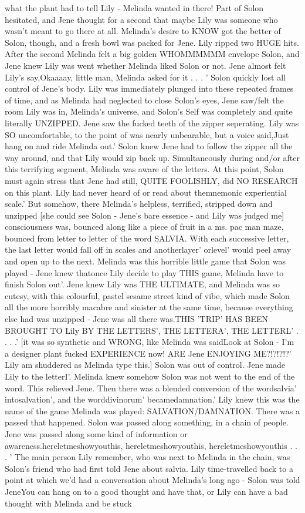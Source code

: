 \documentclass[12pt]{book}
\begin{document}
what the plant had to tell Lily - Melinda wanted in there! Part of Solon hesitated, and Jene thought for a second that maybe Lily was someone who wasn't meant to go there at all. Melinda's desire to KNOW got the better of Solon, though, and a fresh bowl was packed for Jene. Lily ripped two HUGE hits. After the second Melinda felt a big golden WHOMMMMMM envelope Solon, and Jene knew Lily was went whether Melinda liked Solon or not. Jene almost felt Lily's say,Okaaaay, little man, Melinda asked for it . . .  ' Solon quickly lost all control of Jene's body. Lily was immediately plunged into these repeated frames of time, and as Melinda had neglected to close Solon's eyes, Jene saw/felt the room Lily was in, Melinda's universe, and Solon's Self was completely and quite literally UNZIPPED. Jene saw the fucked teeth of the zipper seperating. Lily was SO uncomfortable, to the point of was nearly unbearable, but a voice said,Just hang on and ride Melinda out.' Solon knew Jene had to follow the zipper all the way around, and that Lily would zip back up. Simultaneously during and/or after this terrifying segment, Melinda was aware of the letters. At this point, Solon must again stress that Jene had still, QUITE FOOLISHLY, did NO RESEARCH on this plant. Lily had never heard of or read about themnemonic experiential scale.' But somehow, there Melinda's helpless, terrified, stripped down and unzipped [she could see Solon - Jene's bare essence - and Lily was judged me] consciousness was, bounced along like a piece of fruit in a ms. pac man maze, bounced from letter to letter of the word SALVIA. With each successive letter, the last letter would fall off in scales and anotherlayer' orlevel' would peel away and open up to the next. Melinda was this horrible little game that Solon was played - Jene knew thatonce Lily decide to play THIS game, Melinda have to finish Solon out'. Jene knew Lily was THE ULTIMATE, and Melinda was so cutesy, with this colourful, pastel sesame street kind of vibe, which made Solon all the more horribly macabre and sinister at the same time, because everything else had was unzipped - Jene was all there was.THIS 'TRIP' HAS BEEN BROUGHT TO Lily BY THE LETTERS', THE LETTERA', THE LETTERL' . . .  .' [it was so synthetic and WRONG, like Melinda was saidLook at Solon - I'm a designer plant fucked EXPERIENCE now! ARE Jene ENJOYING ME?!?!?!?' Lily am shuddered as Melinda type this.] Solon was out of control. Jene made Lily to the letterI'. Melinda knew somehow Solon was not went to the end of the word. This relieved Jene. Then there was a blended conversion of the wordsalvia' intosalvation', and the worddivinorum' becamedamnation.' Lily knew this was the name of the game Melinda was played: SALVATION/DAMNATION. There was a passed that happened. Solon was passed along something, in a chain of people. Jene was passed along some kind of information or awareness.hereletmeshowyouthis, hereletmeshowyouthis, hereletmeshowyouthis . . .  ' The main person Lily remember, who was next to Melinda in the chain, was Solon's friend who had first told Jene about salvia. Lily time-travelled back to a point at which we'd had a conversation about Melinda's long ago - Solon was told JeneYou can hang on to a good thought and have that, or Lily can have a bad thought with Melinda and be stuck 
\end{document}
